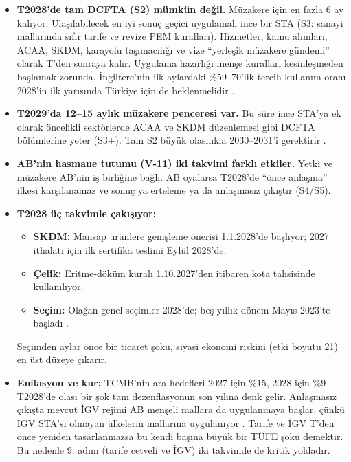 \begin{itemize}
\item
  \textbf{T2028'de tam DCFTA (S2) mümkün değil.} Müzakere için en fazla 6 ay kalıyor. Ulaşılabilecek en iyi sonuç geçici uygulamalı ince bir STA (S3: sanayi mallarında sıfır tarife ve revize PEM kuralları). Hizmetler, kamu alımları, ACAA, SKDM, karayolu taşımacılığı ve vize ``yerleşik müzakere gündemi'' olarak T'den sonraya kalır. Uygulama hazırlığı menşe kuralları kesinleşmeden başlamak zorunda. İngiltere'nin ilk aylardaki \%59--70'lik tercih kullanım oranı \etiketV{} 2028'in ilk yarısında Türkiye için de beklenmelidir \etiketH{}.
\item
  \textbf{T2029'da 12--15 aylık müzakere penceresi var.} Bu süre ince STA'ya ek olarak öncelikli sektörlerde ACAA ve SKDM düzenlemesi gibi DCFTA bölümlerine yeter (S3+). Tam S2 büyük olasılıkla 2030--2031'i gerektirir \etiketH{}.
\item
  \textbf{AB'nin hasmane tutumu (V-11) iki takvimi farklı etkiler.} Yetki ve müzakere AB'nin iş birliğine bağlı. AB oyalarsa T2028'de ``önce anlaşma'' ilkesi karşılanamaz ve sonuç ya erteleme ya da anlaşmasız çıkıştır (S4/S5).
\item
  \textbf{T2028 üç takvimle çakışıyor:}

  \begin{itemize}
  \tightlist
  \item
    \textbf{SKDM:} Mansap ürünlere genişleme önerisi 1.1.2028'de başlıyor; 2027 ithalatı için ilk sertifika teslimi Eylül 2028'de.
  \item
    \textbf{Çelik:} Eritme-döküm kuralı 1.10.2027'den itibaren kota tahsisinde kullanılıyor.
  \item
    \textbf{Seçim:} Olağan genel seçimler 2028'de; beş yıllık dönem Mayıs 2023'te başladı \etiketV{}.
  \end{itemize}

  Seçimden aylar önce bir ticaret şoku, siyasi ekonomi riskini (etki boyutu 21) en üst düzeye çıkarır.
\item
  \textbf{Enflasyon ve kur:} TCMB'nin ara hedefleri 2027 için \%15, 2028 için \%9 \etiketV{}. T2028'de olası bir şok tam dezenflasyonun son yılına denk gelir. Anlaşmasız çıkışta mevcut İGV rejimi AB menşeli mallara da uygulanmaya başlar, çünkü İGV STA'sı olmayan ülkelerin mallarına uygulanıyor \etiketV{}. Tarife ve İGV T'den önce yeniden tasarlanmazsa bu kendi başına büyük bir TÜFE şoku demektir. Bu nedenle 9. adım (tarife cetveli ve İGV) iki takvimde de kritik yoldadır.
\end{itemize}

